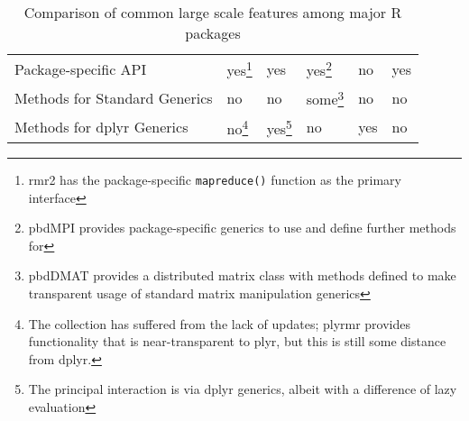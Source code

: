 \begin{table}[htbp]
\begin{tabular}{llllll}
    Package-specific API                                                 & yes\footnote{rmr2 has the package-specific
      \texttt{mapreduce()} function as the primary
    interface}                                                           & yes                                                                   & yes\footnote{pbdMPI provides package-specific
    generics to use and define further methods for}                      & no                                                                    & yes                                                                                                                \\
    Methods for Standard Generics                                        & no                                                                    & no                                            & some\footnote{pbdDMAT provides
      a distributed matrix class with methods defined to make transparent
    usage of standard matrix manipulation generics}                      & no                                                                    & no                                                                                                                 \\
    Methods for dplyr Generics                                           & no\footnote{The collection has suffered
      from the lack of updates; plyrmr provides functionality that is
      near-transparent to plyr, but this is still some distance from
    dplyr\cite{revo2014plyrmr}.}                                         & yes\footnote{The principal interaction
    is via dplyr generics, albeit with a difference of lazy evaluation}  &
    no                                                                   & yes                                                                   & no                                                                                                                 \\
    \bottomrule
  \end{tabular}
  \caption{Comparison of common large scale features among major R packages}
  \label{tab:comp-feat}
\end{table}